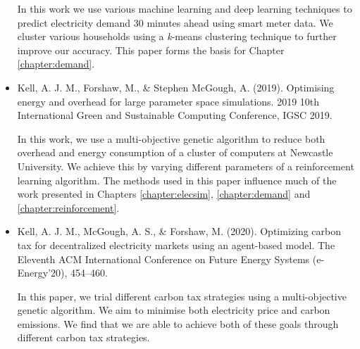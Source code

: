 \begin{itemize}
	In this work we use various machine learning and deep learning techniques to predict electricity demand 30 minutes ahead using smart meter data. We cluster various households using a \textit{k}-means clustering technique to further improve our accuracy. This paper forms the basis for Chapter \ref{chapter:demand}.
	
	\item \cite{Kell2019} Kell, A. J. M., Forshaw, M., \& Stephen McGough, A. (2019). Optimising energy and overhead for large parameter space simulations. 2019 10th International Green and Sustainable Computing Conference, IGSC 2019. 

	In this work, we use a multi-objective genetic algorithm to reduce both overhead and energy consumption of a cluster of computers at Newcastle University. We achieve this by varying different parameters of a reinforcement learning algorithm. The methods used in this paper influence much of the work presented in Chapters \ref{chapter:elecsim}, \ref{chapter:demand} and \ref{chapter:reinforcement}.

	\item \cite{Kell2020a} Kell, A. J. M., McGough, A. S., \& Forshaw, M. (2020). Optimizing carbon tax for decentralized electricity markets using an agent-based model. The Eleventh ACM International Conference on Future Energy Systems (e-Energy’20), 454–460.
	
	In this paper, we trial different carbon tax strategies using a multi-objective genetic algorithm. We aim to minimise both electricity price and carbon emissions. We find that we are able to achieve both of these goals through different carbon tax strategies.
	
\end{itemize}



